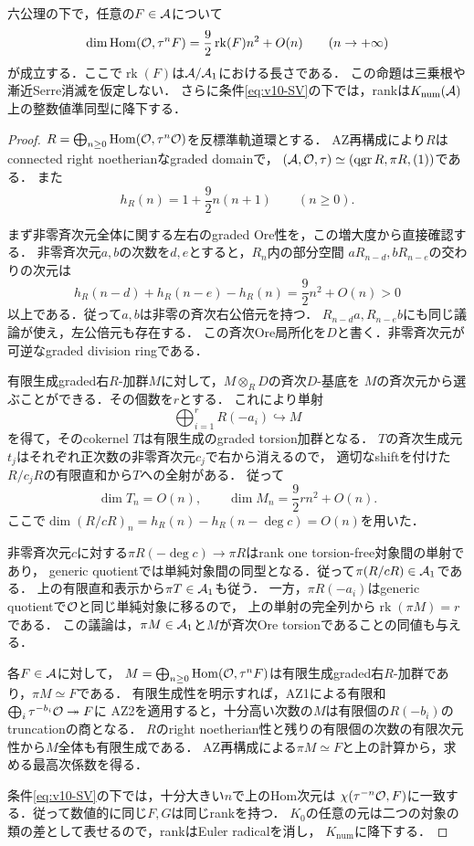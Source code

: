 \documentclass[11pt,a4paper]{ltjsarticle}
\begin{document}
\begin{proposition}
\label{prop:v10-rank-hilbert-leading}
六公理の下で，任意の$F\in\mathcal A$について
\[
 \dim\operatorname{Hom}(\mathcal O,\tau^nF)
 =\frac92\operatorname{rk}(F)n^2+O(n)\qquad(n\to+\infty)
\]
が成立する．ここで$\operatorname{rk}(F)$は$\mathcal A/\mathcal A_1$における長さである．
この命題は三乗根や漸近Serre消滅を仮定しない．
さらに条件\eqref{eq:v10-SV}の下では，rankは$K_{\mathrm{num}}(\mathcal A)$上の整数値準同型に降下する．
\end{proposition}
\begin{proof}
$R=\bigoplus_{n\geq0}\operatorname{Hom}(\mathcal O,\tau^n\mathcal O)$を反標準軌道環とする．
AZ再構成により$R$はconnected right noetherianなgraded domainで，
$(\mathcal A,\mathcal O,\tau)\simeq(\operatorname{qgr} R,\pi R,(1))$である．
また
\[
 h_R(n)=1+\frac92n(n+1)\qquad(n\geq0).
\]

まず非零斉次元全体に関する左右のgraded Ore性を，この増大度から直接確認する．
非零斉次元$a,b$の次数を$d,e$とすると，$R_n$内の部分空間
$aR_{n-d},bR_{n-e}$の交わりの次元は
\[
 h_R(n-d)+h_R(n-e)-h_R(n)=\frac92n^2+O(n)>0
\]
以上である．従って$a,b$は非零の斉次右公倍元を持つ．
$R_{n-d}a,R_{n-e}b$にも同じ議論が使え，左公倍元も存在する．
この斉次Ore局所化を$D$と書く．非零斉次元が可逆なgraded division ringである．

有限生成graded右$R$-加群$M$に対して，$M\otimes_R D$の斉次$D$-基底を
$M$の斉次元から選ぶことができる．その個数を$r$とする．
これにより単射
\[
 \bigoplus_{i=1}^rR(-a_i)\hookrightarrow M
\]
を得て，そのcokernel $T$は有限生成のgraded torsion加群となる．
$T$の斉次生成元$t_j$はそれぞれ正次数の非零斉次元$c_j$で右から消えるので，
適切なshiftを付けた$R/c_jR$の有限直和から$T$への全射がある．
従って
\[
 \dim T_n=O(n),\qquad
 \dim M_n=\frac92r n^2+O(n).
\]
ここで$\dim(R/cR)_n=h_R(n)-h_R(n-\deg c)=O(n)$を用いた．

非零斉次元$c$に対する$\pi R(-\deg c)\to\pi R$はrank one torsion-free対象間の単射であり，
generic quotientでは単純対象間の同型となる．従って$\pi(R/cR)\in\mathcal A_1$である．
上の有限直和表示から$\pi T\in\mathcal A_1$も従う．
一方，$\pi R(-a_i)$はgeneric quotientで$\mathcal O$と同じ単純対象に移るので，
上の単射の完全列から$\operatorname{rk}(\pi M)=r$である．
この議論は，$\pi M\in\mathcal A_1$と$M$が斉次Ore torsionであることの同値も与える．

各$F\in\mathcal A$に対して，
$M=\bigoplus_{n\geq0}\operatorname{Hom}(\mathcal O,\tau^nF)$は有限生成graded右$R$-加群であり，$\pi M\simeq F$である．
有限生成性を明示すれば，AZ1による有限和$\bigoplus_i\tau^{-b_i}\mathcal O\twoheadrightarrow F$に
AZ2を適用すると，十分高い次数の$M$は有限個の$R(-b_i)$のtruncationの商となる．
$R$のright noetherian性と残りの有限個の次数の有限次元性から$M$全体も有限生成である．
AZ再構成による$\pi M\simeq F$と上の計算から，求める最高次係数を得る．

条件\eqref{eq:v10-SV}の下では，十分大きい$n$で上のHom次元は
$\chi(\tau^{-n}\mathcal O,F)$に一致する．従って数値的に同じ$F,G$は同じrankを持つ．
$K_0$の任意の元は二つの対象の類の差として表せるので，rankはEuler radicalを消し，
$K_{\mathrm{num}}$に降下する．
\end{proof}
\end{document}

